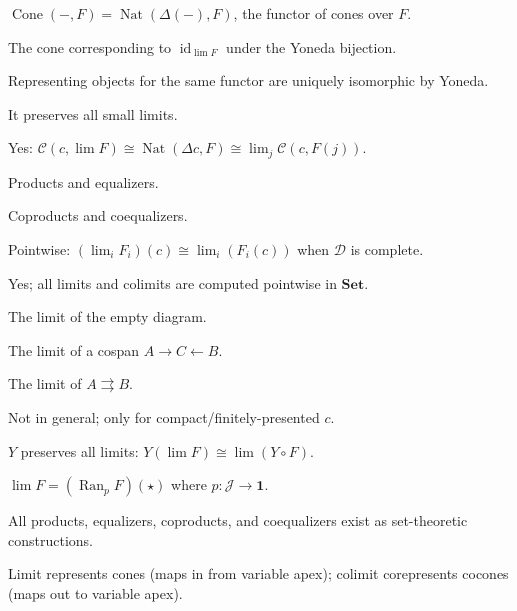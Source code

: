 \begin{exercisesbox}
\begin{qa}
       {$\operatorname{Cone}(-,F) = \operatorname{Nat}(\Delta(-), F)$, the functor of cones over $F$.}

       {The cone corresponding to $\operatorname{id}_{\lim F}$ under the Yoneda bijection.}

       {Representing objects for the same functor are uniquely isomorphic by Yoneda.}

       {It preserves all small limits.}

       {Yes: $\mathcal{C}(c,\lim F) \cong \operatorname{Nat}(\Delta c,F) \cong \lim_j \mathcal{C}(c,F(j))$.}

       {Products and equalizers.}

       {Coproducts and coequalizers.}

       {Pointwise: $(\lim_i F_i)(c) \cong \lim_i(F_i(c))$ when $\mathcal{D}$ is complete.}

       {Yes; all limits and colimits are computed pointwise in $\mathbf{Set}$.}

       {The limit of the empty diagram.}

       {The limit of a cospan $A \to C \leftarrow B$.}

       {The limit of $A \rightrightarrows B$.}

       {Not in general; only for compact/finitely-presented $c$.}

       {$Y$ preserves all limits: $Y(\lim F) \cong \lim(Y \circ F)$.}

       {$\lim F = (\operatorname{Ran}_p F)(\star)$ where $p : \mathcal{J} \to \mathbf{1}$.}

       {All products, equalizers, coproducts, and coequalizers exist as set-theoretic constructions.}

       {Limit represents cones (maps in from variable apex); colimit corepresents cocones (maps out to variable apex).}
\end{qa}
\end{exercisesbox}

